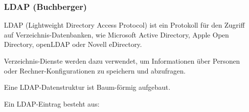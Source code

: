 \subsubsection{LDAP (Buchberger)}

LDAP (Lightweight Directory Access Protocol) ist ein Protokoll für den Zugriff auf Verzeichnis-Datenbanken, wie Microsoft Active Directory, Apple Open Directory, openLDAP oder Novell eDirectory.

Verzeichnis-Dienste werden dazu verwendet, um Informationen über Personen oder Rechner-Konfigurationen zu speichern und abzufragen.

Eine LDAP-Datenstruktur ist Baum-förmig aufgebaut.

Ein LDAP-Eintrag besteht aus:

\begin{description}[style=nextline]
	\item[text]


\end{description}